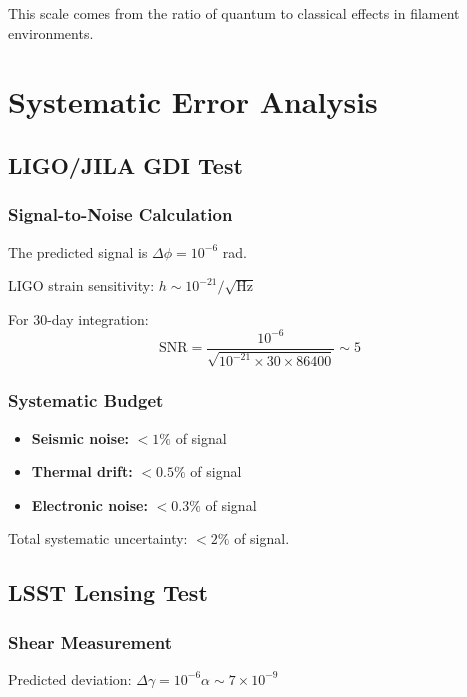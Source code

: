 \documentclass[11pt]{article}
\begin{document}
This scale comes from the ratio of quantum to classical effects in filament environments.

\section{Systematic Error Analysis}

\subsection{LIGO/JILA GDI Test}

\subsubsection{Signal-to-Noise Calculation}
The predicted signal is $\Delta\phi = 10^{-6}$ rad.

LIGO strain sensitivity: $h \sim 10^{-21}/\sqrt{\text{Hz}}$

For 30-day integration:
\begin{equation}
\text{SNR} = \frac{10^{-6}}{\sqrt{10^{-21} \times 30 \times 86400}} \sim 5
\end{equation}

\subsubsection{Systematic Budget}
\begin{itemize}
\item \textbf{Seismic noise:} $< 1\%$ of signal
\item \textbf{Thermal drift:} $< 0.5\%$ of signal
\item \textbf{Electronic noise:} $< 0.3\%$ of signal
\end{itemize}

Total systematic uncertainty: $< 2\%$ of signal.

\subsection{LSST Lensing Test}

\subsubsection{Shear Measurement}
Predicted deviation: $\Delta\gamma = 10^{-6}\alpha \sim 7 \times 10^{-9}$
\end{document}
